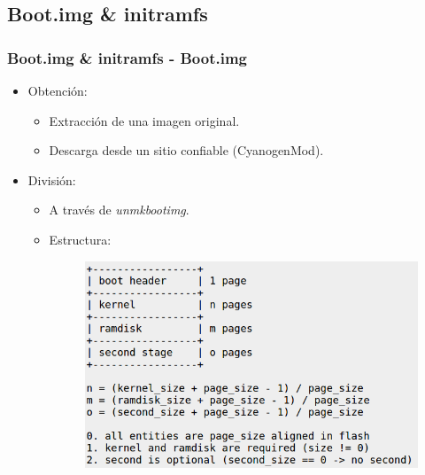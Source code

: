 \subsection{Boot.img \& initramfs}
\begin{frame}
  \frametitle{Boot.img \& initramfs - Boot.img}
  \begin{itemize}
      \item Obtención:
      \begin{itemize}      
	  \item Extracción de una imagen original.
	  
	  \item Descarga desde un sitio confiable (CyanogenMod).
      \end{itemize}      
      
      \item División:
      \begin{itemize}
	  \item A través de \textit{unmkbootimg}.
      
	  \item Estructura:
	  \begin{figure}
	    \includegraphics[scale=0.3]{images/boot-image-structure.png}
	  \end{figure}
      \end{itemize}
  \end{itemize}
\end{frame}

